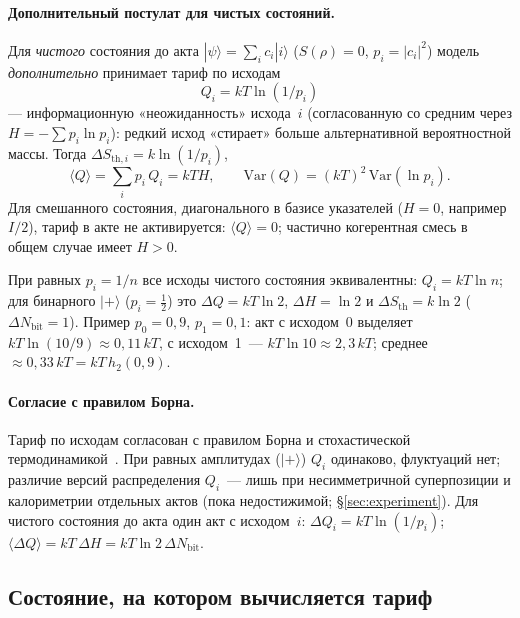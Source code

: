 \documentclass[11pt,a4paper]{article}
\newcommand{\Sref}[1]{\hyperref[#1]{\S\ref{#1}}}
\begin{document}
\paragraph{Дополнительный постулат для чистых состояний.}
Для \emph{чистого} состояния до акта $|\psi\rangle=\sum_i c_i|i\rangle$ ($S(\rho)=0$, $p_i=|c_i|^2$) модель \emph{дополнительно} принимает тариф по исходам
\begin{equation}
\boxed{Q_i = kT\ln(1/p_i)}
\end{equation}
--- информационную «неожиданность» исхода~$i$ (согласованную со средним через $H=-\sum p_i\ln p_i$): редкий исход «стирает» больше альтернативной вероятностной массы. Тогда $\Delta S_{\mathrm{th},i}=k\ln(1/p_i)$,
\begin{equation}
\langle Q\rangle = \sum_i p_i\, Q_i = kT H, \qquad \mathrm{Var}(Q) = (kT)^2\,\mathrm{Var}(\ln p_i).
\end{equation}
Для смешанного состояния, диагонального в базисе указателей ($H=0$, например $I/2$), тариф в акте не активируется: $\langle Q\rangle=0$; частично когерентная смесь в общем случае имеет $H>0$.

При равных $p_i=1/n$ все исходы чистого состояния эквивалентны: $Q_i = kT\ln n$; для бинарного $|{+}\rangle$ ($p_i=\tfrac12$) это $\Delta Q = kT\ln 2$, $\Delta H=\ln 2$ и $\Delta S_{\mathrm{th}} = k\ln 2$ ($\Delta N_{\mathrm{bit}}=1$). Пример $p_0=0{,}9$, $p_1=0{,}1$: акт с исходом~0 выделяет $kT\ln(10/9)\approx 0{,}11\,kT$, с исходом~1~--- $kT\ln 10\approx 2{,}3\,kT$; среднее $\approx 0{,}33\,kT = kT\,h_2(0{,}9)$.

\paragraph{Согласие с правилом Борна.}
Тариф по исходам согласован с правилом Борна и стохастической термодинамикой~\cite{sagawa2008}. При равных амплитудах ($|{+}\rangle$) $Q_i$ одинаково, флуктуаций нет; различие версий распределения $Q_i$~--- лишь при несимметричной суперпозиции и калориметрии отдельных актов (пока недостижимой; \Sref{sec:experiment}). Для чистого состояния до акта один акт с исходом~$i$: $\Delta Q_i = kT\ln(1/p_i)$; $\langle\Delta Q\rangle = kT\,\Delta H = kT\ln 2\,\Delta N_{\mathrm{bit}}$.

\subsection{Состояние, на котором вычисляется тариф}\label{sec:conditioning}
\end{document}
